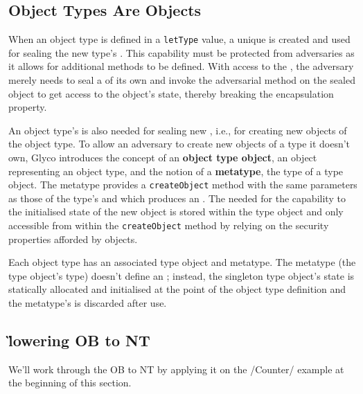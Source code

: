\documentclass[main.tex]{subfiles}
\begin{document}
\subsection{Object Types Are Objects}
When an object type is defined in a \texttt{letType} value, a unique  is created and used for sealing the new type's . This capability must be protected from adversaries as it allows for additional methods to be defined. With access to the , the adversary merely needs to seal a  of its own and invoke the adversarial method on the sealed object to get access to the object's state, thereby breaking the encapsulation property.

An object type's  is also needed for sealing new , i.e., for creating new objects of the object type. To allow an adversary to create new objects of a type it doesn't own, Glyco introduces the concept of an \textbf{object type object}, an object representing an object type, and the notion of a \textbf{metatype}, the type of a type object. The metatype provides a \texttt{createObject} method with the same parameters as those of the type's  and which produces an . The  needed for  the capability to the initialised state of the new object is stored within the type object and only accessible from within the \texttt{createObject} method by relying on the security properties afforded by objects.

Each object type has an associated type object and metatype. The metatype (the type object's type) doesn't define an ; instead, the singleton type object's state is statically allocated and initialised at the point of the object type definition and the metatype's  is discarded after use.

\subsection{\G{lowering} OB to NT}
We'll work through the OB to NT  by applying it on the \iil/Counter/ example at the beginning of this section.
\end{document}
